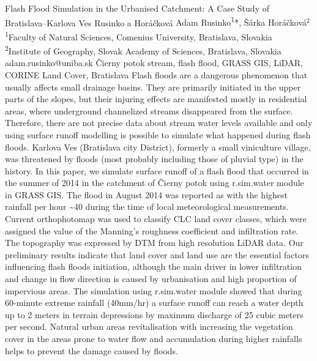 \abstract
{Flash Flood Simulation in the Urbanised Catchment: A Case Study of Bratislava–Karlova Ves} %
{Rusinko a Horáčková} %
{Adam Rusinko\textsuperscript{1}*, Šárka Horáčková$^2$} %
{\KLtag} %
{
\textsuperscript{1}Faculty of Natural Sciences, Comenius University, Bratislava, Slovakia\\
\textsuperscript{2}Institute of Geography, Slovak Academy of Sciences, Bratislava, Slovakia
} %
{adam.rusinko@uniba.sk}  %
{Čierny potok stream, flash flood, GRASS GIS, LiDAR, CORINE Land Cover, Bratislava}%
{Flash floods are a dangerous phenomenon that usually affects small drainage basins. They are primarily initiated in the upper parts of the slopes, but their injuring effects are manifested mostly in residential areas, where underground channelized streams disappeared from the surface. Therefore, there are not precise data about stream water levels available and only using surface runoff modelling is possible to simulate what happened during flash floods. Karlova Ves (Bratislava city District), formerly a small viniculture village, was threatened by floods (most probably including those of pluvial type) in the history. In this paper, we simulate surface runoff of a flash flood that occurred in the summer of 2014 in the catchment of Čierny potok using r.sim.water module in GRASS GIS. The flood in August 2014 was reported as with the highest rainfall per hour \textasciitilde40 during the time of local meteorological measurements. Current orthophotomap was used to classify CLC land cover classes, which were assigned the value of the Manning’s roughness coefficient and infiltration rate. The topography was expressed by DTM from high resolution LiDAR data. Our preliminary results indicate that land cover and land use are the essential factors influencing flash floods initiation, although the main driver in lower infiltration and change in flow direction is caused by urbanisation and high proportion of impervious areas. The simulation using r.sim.water module showed that during 60-minute extreme rainfall (40mm/hr) a surface runoff can reach a water depth up to 2 meters in terrain depressions by maximum discharge of 25 cubic meters per second. Natural urban areas revitalisation with increasing the vegetation cover in the areas prone to water flow and accumulation during higher rainfalls helps to prevent the damage caused by floods.
}%
